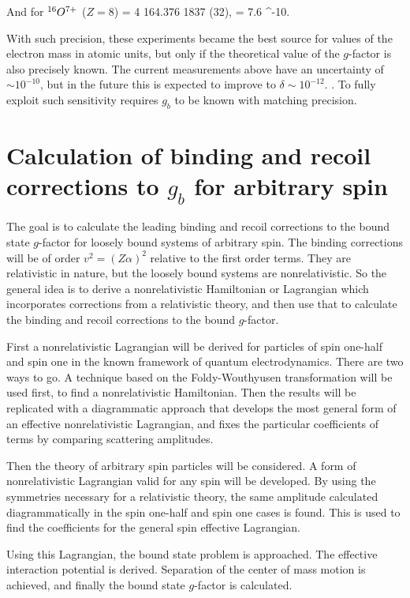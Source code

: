 And for $^{16}O^{7+}$ ($Z=8$)
\beq
		  = \num{4 164.376 1837 (32)}, \hspace{3em} \delta= 7.6 ^{-10}.
\eeq

With such precision, these experiments became the best source for values of the electron mass in atomic units, but only if the theoretical value of the $g$-factor is also precisely known.  The current measurements above have an uncertainty of $ \sim 10^{-10}$, but in the future this is expected to improve to $\delta \sim 10^{-12}$. \cite{Jentschura2006102,Quint:2008}.  To fully exploit such sensitivity requires $g_b$ to be known with matching precision.  



\section{Calculation of binding and recoil corrections to $g_b$ for arbitrary spin}
The goal is to calculate the leading binding and recoil corrections to the bound state $g$-factor for loosely bound systems of arbitrary spin.  The binding corrections will be of order $v^2=(Z\alpha)^2$ relative to the first order terms. They are relativistic in nature, but the loosely bound systems are nonrelativistic.  So the general idea is to derive a nonrelativistic Hamiltonian or Lagrangian which incorporates corrections from a relativistic theory, and then use that to calculate the binding and recoil corrections to the bound $g$-factor.

First a nonrelativistic Lagrangian will be derived for particles of spin one-half and spin one in the known framework of quantum electrodynamics.  There are two ways to go.  A technique based on the Foldy-Wouthyusen transformation will be used first, to find a nonrelativistic Hamiltonian.  Then the results will be replicated with a diagrammatic approach that develops the most general form of an effective nonrelativistic Lagrangian, and fixes the particular coefficients of terms by comparing scattering amplitudes.

Then the theory of arbitrary spin particles will be considered.  A form of nonrelativistic Lagrangian valid for any spin will be developed.  By using the symmetries necessary for a relativistic theory, the same amplitude calculated diagrammatically in the spin one-half and spin one cases is found.  This is used to find the coefficients for the general spin effective Lagrangian.

Using this Lagrangian, the bound state problem is approached.  The effective interaction potential is derived.  Separation of the center of mass motion is achieved, and finally the bound state $g$-factor is calculated.




